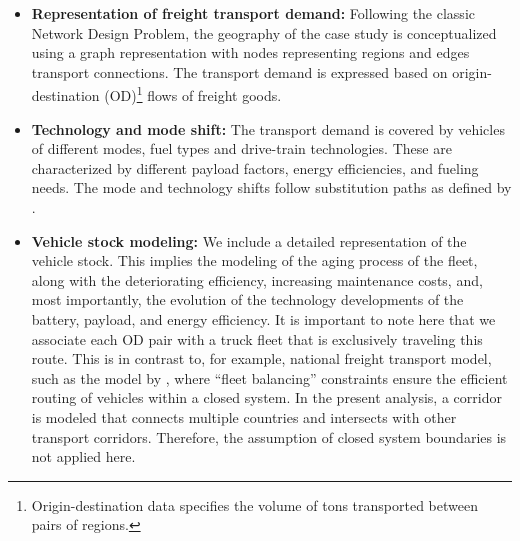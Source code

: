 \documentclass[preprint,10pt,review, authoryear]{elsarticle}
\begin{document}
        \begin{itemize}
            \item \textbf{Representation of freight transport demand:} Following the classic Network Design Problem, the geography of the case study is conceptualized using a graph representation with nodes representing regions and edges transport connections. The transport demand is expressed based on origin-destination (OD)\footnote{Origin-destination data specifies the volume of tons transported between pairs of regions.} flows of freight goods. 
            
            \item \textbf{Technology and mode shift:} The transport demand is covered by vehicles of different modes, fuel types and drive-train technologies. These are characterized by different payload factors, energy efficiencies, and fueling needs. The mode and technology shifts follow substitution paths as defined by \citet{bakker2023stram}.
            
            \item \textbf{Vehicle stock modeling:} We include a detailed representation of the vehicle stock. This implies the modeling of the aging process of the fleet, along with the deteriorating efficiency, increasing maintenance costs, and, most importantly, the evolution of the technology developments of the battery, payload, and energy efficiency. It is important to note here that we associate each OD pair with a truck fleet that is exclusively traveling this route. This is in contrast to, for example, national freight transport model, such as the model by \citet{bakker2023stram}, where \enquote{fleet balancing} constraints ensure the efficient routing of vehicles within a closed system. In the present analysis, a corridor is modeled that connects multiple countries and intersects with other transport corridors. Therefore, the assumption of closed system boundaries is not applied here. 
             

\end{itemize}
\end{document}
